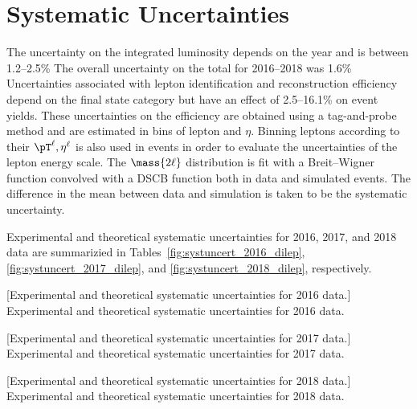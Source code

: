 \section{Systematic Uncertainties}
\label{sec:syst_uncert_dilep}
The uncertainty on the integrated luminosity depends on the year and is between 1.2--2.5\% %
The overall uncertainty on the total \lumiint for 2016--2018 was 1.6\% %
Uncertainties associated with lepton identification and reconstruction efficiency depend on the final state category but have an effect of 2.5--16.1\% on event yields.
These uncertainties on the efficiency are obtained using a tag-and-probe method and are estimated in bins of lepton \pT and $\eta$.
Binning leptons according to their $\pT^\ell, \eta^\ell$ is also used in \ztolplm events in order to evaluate the uncertainties of the lepton energy scale.
The $\mass{2\ell}$ distribution is fit with a Breit--Wigner function convolved with a DSCB function both in data and simulated events.
The difference in the mean between data and simulation is taken to be the systematic uncertainty. %

Experimental and theoretical systematic uncertainties for 2016, 2017, and 2018 data are summarizied in Tables~\ref{fig:systuncert_2016_dilep}, \ref{fig:systuncert_2017_dilep}, and \ref{fig:systuncert_2018_dilep}, respectively.
\begin{multiFigure}
        \centering
            [Experimental and theoretical systematic uncertainties for 2016 data.]
            {Experimental and theoretical systematic uncertainties for 2016 data.} %
        \label{fig:systuncert_2016_dilep}
\end{multiFigure}
\begin{multiFigure}
        \centering
            [Experimental and theoretical systematic uncertainties for 2017 data.]
            {Experimental and theoretical systematic uncertainties for 2017 data.} %
        \label{fig:systuncert_2017_dilep}
\end{multiFigure}
\begin{multiFigure}
        \centering
            [Experimental and theoretical systematic uncertainties for 2018 data.]
            {Experimental and theoretical systematic uncertainties for 2018 data.} %
        \label{fig:systuncert_2018_dilep}
\end{multiFigure}
